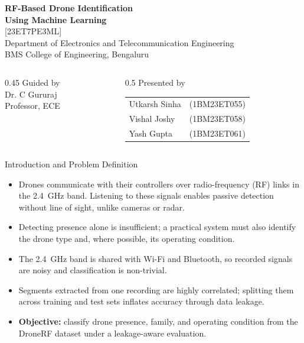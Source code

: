 \documentclass[aspectratio=169,11pt]{beamer}
\begin{document}
\begin{frame}[plain]
\vspace{0.3cm}
\begin{center}
{\LARGE\bfseries RF-Based Drone Identification\\[2pt]
Using Machine Learning}\\[6pt]
{\footnotesize\color{gray}[23ET7PE3ML]}\\[6pt]
{\normalsize Department of Electronics and Telecommunication Engineering}\\[4pt]
{\footnotesize BMS College of Engineering, Bengaluru}
\end{center}
\vspace{0.6cm}
\begin{columns}[t]
\begin{column}{0.45\textwidth}
{\large Guided by}\\[3pt]
Dr. C Gururaj\\
Professor, ECE
\end{column}
\begin{column}{0.5\textwidth}
{\large Presented by}\\[3pt]
\begin{tabular}{@{}ll@{}}
Utkarsh Sinha & (1BM23ET055)\\
Vishal Joshy & (1BM23ET058)\\
Yash Gupta & (1BM23ET061)\\
\end{tabular}
\end{column}
\end{columns}
\end{frame}

\begin{frame}{Introduction and Problem Definition}
\begin{itemize}
\item Drones communicate with their controllers over radio-frequency (RF) links
in the 2.4~GHz band. Listening to these signals enables passive detection
without line of sight, unlike cameras or radar.
\item Detecting presence alone is insufficient; a practical system must also
identify the drone type and, where possible, its operating condition.
\item The 2.4~GHz band is shared with Wi-Fi and Bluetooth, so recorded signals
are noisy and classification is non-trivial.
\item Segments extracted from one recording are highly correlated; splitting
them across training and test sets inflates accuracy through data leakage.
\item \textbf{Objective:} classify drone presence, family, and operating
condition from the DroneRF dataset under a leakage-aware evaluation.
\end{itemize}
\end{frame}
\end{document}
